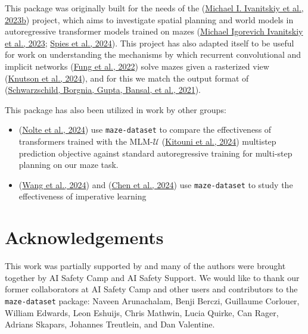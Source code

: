 \documentclass[10pt,a4paper,onecolumn]{article}
\begin{document}
This package was originally built for the needs of the
(\protect\hyperlink{ref-maze-transformer-github}{Michael I. Ivanitskiy
et al., 2023b}) project, which aims to investigate spatial planning and
world models in autoregressive transformer models trained on mazes
(\protect\hyperlink{ref-ivanitskiy2023structuredworldreps}{Michael
Igorevich Ivanitskiy et al., 2023};
\protect\hyperlink{ref-spies2024causalworldmodels}{Spies et al., 2024}).
This project has also adapted itself to be useful for work on
understanding the mechanisms by which recurrent convolutional and
implicit networks (\protect\hyperlink{ref-fung2022jfb}{Fung et al.,
2022}) solve mazes given a rasterized view
(\protect\hyperlink{ref-knutson2024logicalextrapolation}{Knutson et al.,
2024}), and for this we match the output format of
(\protect\hyperlink{ref-easy_to_hard}{Schwarzschild, Borgnia, Gupta,
Bansal, et al., 2021}).

This package has also been utilized in work by other groups:

\begin{itemize}
\item
  (\protect\hyperlink{ref-nolte2024multistep}{Nolte et al., 2024}) use
  \texttt{maze-dataset} to compare the effectiveness of transformers
  trained with the MLM-\(\mathcal{U}\)
  (\protect\hyperlink{ref-MLMU-kitouni2024factorization}{Kitouni et al.,
  2024}) multistep prediction objective against standard autoregressive
  training for multi-step planning on our maze task.
\item
  (\protect\hyperlink{ref-wang2024imperative}{Wang et al., 2024}) and
  (\protect\hyperlink{ref-chen2024iaimperative}{Chen et al., 2024}) use
  \texttt{maze-dataset} to study the effectiveness of imperative
  learning
\end{itemize}

\hypertarget{acknowledgements}{%
\section{Acknowledgements}\label{acknowledgements}}

This work was partially supported by and many of the authors were
brought together by AI Safety Camp and AI Safety Support. We would like
to thank our former collaborators at AI Safety Camp and other users and
contributors to the \texttt{maze-dataset} package: Naveen Arunachalam,
Benji Berczi, Guillaume Corlouer, William Edwards, Leon Eshuijs, Chris
Mathwin, Lucia Quirke, Can Rager, Adrians Skapars, Johannes Treutlein,
and Dan Valentine.
\end{document}
